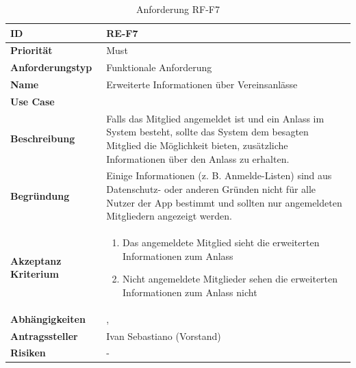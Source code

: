 \begin{table}[ht]
\centering
  \begin{tabular}{ l | p{8cm} }
	\hline
	\rowcolor{gray}
	\textbf{ID} 			&	\textbf{RE-F7}\\ \hline
	\textbf{Priorität} 		&	Must\\ \hline
	\textbf{Anforderungstyp}	&	Funktionale Anforderung\\ \hline
	\textbf{Name} 			&	Erweiterte Informationen über Vereinsanlässe\\ \hline
	\textbf{Use Case} 		&	\nameref{table:use_case_5}\\ \hline
	\textbf{Beschreibung} 	&	Falls das Mitglied angemeldet ist und ein Anlass im System besteht, sollte das System dem besagten Mitglied die Möglichkeit bieten, zusätzliche Informationen über den Anlass zu erhalten.\\ \hline
	\textbf{Begründung} 		&	Einige Informationen (z. B. Anmelde-Listen) sind aus Datenschutz- oder anderen Gründen nicht für alle Nutzer der App bestimmt und sollten nur angemeldeten Mitgliedern angezeigt werden.\\ \hline
	\textbf{Akzeptanz Kriterium}	&	\begin{enumerate}
					\item Das angemeldete Mitglied sieht die erweiterten Informationen zum Anlass
					\item Nicht angemeldete Mitglieder sehen die erweiterten Informationen zum Anlass nicht
					\end{enumerate}
					\\ \hline
	\textbf{Abhängigkeiten} 	&	\nameref{table:req_1}, \nameref{table:req_6}\\ \hline
	\textbf{Antragssteller} 	&	Ivan Sebastiano (Vorstand)\\ \hline
	\textbf{Risiken}	 	&	-
  \end{tabular}
   \caption{Anforderung RF-F7}\label{table:req_7}
\end{table}

